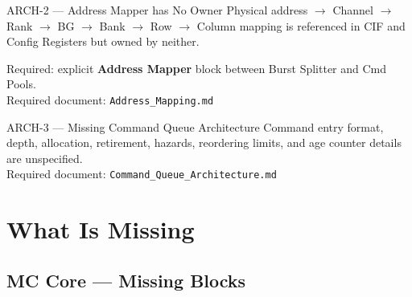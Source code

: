 \documentclass[10pt,a4paper]{article}
\begin{document}
\vspace{4pt}
\begin{warnbox}{ARCH-2 --- Address Mapper has No Owner}
Physical address $\to$ Channel $\to$ Rank $\to$ BG $\to$ Bank $\to$ Row $\to$ Column
mapping is referenced in CIF and Config Registers but owned by neither.

Required: explicit \textbf{Address Mapper} block between Burst Splitter and Cmd Pools.\\
Required document: \texttt{Address\_Mapping.md}
\end{warnbox}

\vspace{4pt}
\begin{warnbox}{ARCH-3 --- Missing Command Queue Architecture}
Command entry format, depth, allocation, retirement, hazards, reordering limits, and
age counter details are unspecified.\\
Required document: \texttt{Command\_Queue\_Architecture.md}
\end{warnbox}

\section{What Is Missing}

\subsection{MC Core --- Missing Blocks}
\end{document}
